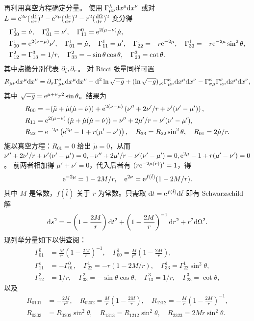 再利用真空方程确定分量。
使用 $\Gamma^\lambda_{\mu\nu}\dd x^\mu\dd x^\nu$ 或对 $L=\mathrm{e}^{2\nu}(\dv{\hat t}{\tau})^2-\mathrm{e}^{2\mu}(\dv{r}{\tau})^2-r^2(\dv{\Omega}{\tau})^2$ 变分得
\begin{align*}
    & \Gamma_{00}^0=\dot{\nu}, \quad \Gamma_{01}^0=\nu^{\prime}, \quad \Gamma_{11}^0=\mathrm{e}^{2(\mu-\nu)} \dot{\mu}, \\& \Gamma_{00}^1=\mathrm{e}^{2(\nu-\mu)} \nu^{\prime}, \quad \Gamma_{01}^1=\dot{\mu}, \quad \Gamma_{11}^1=\mu^{\prime}, \quad \Gamma_{22}^1=-r \mathrm{e}^{-2 \mu}, \quad \Gamma_{33}^1=-r \mathrm{e}^{-2 \mu} \sin ^2 \theta, \\
    & \Gamma_{12}^2=\Gamma_{13}^3={1}/{r}, \quad \Gamma_{33}^2=-\sin \theta \cos \theta, \quad \Gamma_{23}^3=\cot \theta.
\end{align*}
其中点撇分别代表 $\partial_{\hat t},\partial_{r}$。
对 Ricci 张量同样可置
\[R_{\mu\nu}\dd x^\mu\dd x^\nu=\partial_\sigma\Gamma^\sigma_{\mu\nu}\dd x^\mu\dd x^\nu-\dd^2\ln\sqrt{-g}+(\ln\sqrt{-g})_{,\kappa}\Gamma^\kappa_{\mu\nu}\dd x^\mu\dd x^\nu-\Gamma^\kappa_{\sigma\mu}\Gamma^\sigma_{\kappa\nu}\dd x^\mu\dd x^\nu,\]
其中 $\sqrt{-g}=\mathrm{e}^{\mu+\nu}r^2\sin\theta$。结果为
\begin{align*}
    R_{00} &= -(\ddot\mu+\dot\mu(\dot\mu-\dot\nu))+\mathrm{e}^{2(\nu-\mu)} \left(\nu''+2\nu'/r+\nu'(\nu'-\mu')\right), \\
    R_{11} &= \mathrm{e}^{2(\mu-\nu)} \left(\ddot\mu+\dot\mu(\dot\mu-\dot\nu)\right)-\nu''+2\mu'/r-\nu'(\nu'-\mu'), \\
    R_{22} &= \mathrm{e}^{-2\mu} \left(\mathrm{e}^{2\mu}-1+r(\mu'-\nu')\right), \quad R_{33} = R_{22} \sin ^2 \theta,\quad R_{01} = 2\dot\mu/r.
\end{align*}
施以真空方程：$R_{01}=0$ 给出 $\dot\mu=0$，从而
$\nu''+2\nu'/r+\nu'(\nu'-\mu')=0, 
-\nu''+2\mu'/r-\nu'(\nu'-\mu')=0, 
\mathrm{e}^{2\mu}-1+r(\mu'-\nu')=0$。
前两者相加得 $\mu'+\nu'=0$，代入后者有 $(r\mathrm{e}^{-2\mu(r)})'=1$，得
\[\mathrm{e}^{-2\mu}=1-{2M}/{r},\quad \mathrm{e}^{2\nu}=\mathrm{e}^{f(\hat t)}(1-{2M}/{r}).\]
其中 $M$ 是常数，$f(\hat t)$ 关于 $r$ 为常数。只需取 $\dd t=\mathrm{e}^{f(\hat t)}\dd\hat t$ 即有 Schwarzschild 解
\[\dd s^2=-\left(1-\frac{2M}{r}\right)\dd t^2+\left(1-\frac{2M}{r}\right)^{-1}\dd r^2+r^2\dd\Omega^2.\]
现列举分量如下以供查阅：
\begin{align*}
    \Gamma_{01}^0&=\frac{M}{r^2}\left(1-\frac{2M}{r}\right)^{-1}, \quad \Gamma_{00}^1=\frac{M}{r^2}\left(1-\frac{2M}{r}\right), \\
    \Gamma_{11}^1&=-\Gamma_{01}^0,\quad\Gamma_{22}^1=-r(1-{2M}/{r}),\quad\Gamma_{33}^1=\Gamma_{22}^1\sin ^2 \theta, \\
    \Gamma_{12}^2&=1 / r,\quad\Gamma_{33}^2=-\sin \theta \cos \theta,\quad\Gamma_{13}^3=1 / r,\quad\Gamma_{23}^3=\cot \theta,
\end{align*}
以及
\begin{align*}
    R_{0101}&=-\frac{2 M}{r^3}, \quad R_{0202}=\frac{M}{r}\left(1-\frac{2M}{r}\right), \quad R_{1212}=-\frac{M}{r}\left(1-\frac{2M}{r}\right)^{-1}, \\
    R_{0303}&=R_{0202} \sin ^2 \theta, \quad R_{1313}=R_{1212} \sin ^2 \theta, \quad R_{2323}=2 M r \sin ^2 \theta.
\end{align*}


